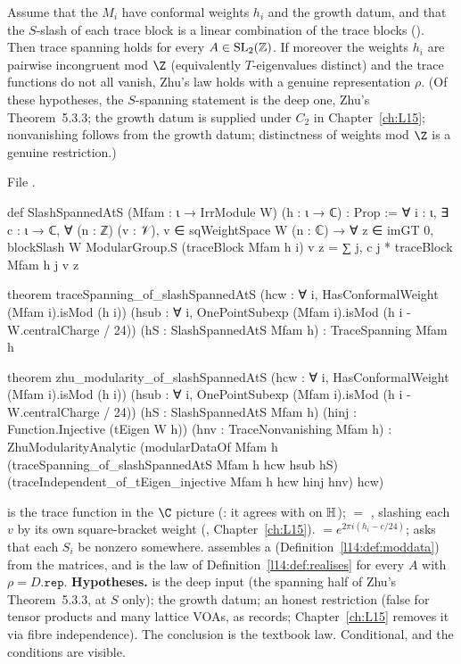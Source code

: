 \begin{theorem}\label{l14:thm:rhoS}
Assume that the $M_i$ have conformal weights $h_i$ and the growth datum, and that the $S$-slash of each trace block is a linear
combination of the trace blocks (). Then trace spanning holds for every $A\in\mathrm{SL}_2(\mathbb{Z})$. If moreover
the weights $h_i$ are pairwise incongruent mod $\Z$ (equivalently $T$-eigenvalues distinct) and the trace functions do not all
vanish, Zhu's law holds with a genuine representation $\rho$. (Of these hypotheses, the $S$-spanning statement is the deep
one, Zhu's Theorem~5.3.3; the growth datum is supplied under $C_2$ in Chapter~\ref{ch:L15}; nonvanishing follows from the
growth datum; distinctness of weights mod $\Z$ is a genuine restriction.)
\end{theorem}
\noindent File .
\begin{leancode}
def SlashSpannedAtS (Mfam : ι → IrrModule W) (h : ι → ℂ) : Prop :=
  ∀ i : ι, ∃ c : ι → ℂ, ∀ (n : ℤ) (v : 𝒱), v ∈ sqWeightSpace W (n : ℂ) → ∀ z ∈ imGT 0,
    blockSlash W ModularGroup.S (traceBlock Mfam h i) v z
      = ∑ j, c j * traceBlock Mfam h j v z

theorem traceSpanning_of_slashSpannedAtS (hcw : ∀ i, HasConformalWeight (Mfam i).isMod (h i))
    (hsub : ∀ i, OnePointSubexp (Mfam i).isMod (h i - W.centralCharge / 24))
    (hS : SlashSpannedAtS Mfam h) : TraceSpanning Mfam h

theorem zhu_modularity_of_slashSpannedAtS (hcw : ∀ i, HasConformalWeight (Mfam i).isMod (h i))
    (hsub : ∀ i, OnePointSubexp (Mfam i).isMod (h i - W.centralCharge / 24))
    (hS : SlashSpannedAtS Mfam h)
    (hinj : Function.Injective (tEigen W h)) (hnv : TraceNonvanishing Mfam h) :
    ZhuModularityAnalytic
      (modularDataOf Mfam h (traceSpanning_of_slashSpannedAtS Mfam h hcw hsub hS)
        (traceIndependent_of_tEigen_injective Mfam h hcw hinj hnv) hcw)
\end{leancode}
\begin{dictionary}
 is the trace function in the $\C$ picture (: it agrees with  on
$\mathbb{H}$);  $=$ , slashing each $v$ by its own square-bracket
weight (, Chapter~\ref{ch:L15}).  $=e^{2\pi i(h_i-c/24)}$; 
asks that each $S_i$ be nonzero somewhere.  assembles a  (Definition~\ref{l14:def:moddata})
from the matrices, and  is the law of Definition~\ref{l14:def:realises} for every $A$ with
$\rho = D.\mathtt{rep}$. \textbf{Hypotheses.}  is the deep input (the spanning half of Zhu's Theorem~5.3.3, at $S$
only);  the growth datum;  an honest restriction (false for tensor products and many lattice VOAs, as
 records; Chapter~\ref{ch:L15} removes it via fibre independence). The conclusion is the
textbook law. Conditional, and the conditions are visible.
\end{dictionary}
